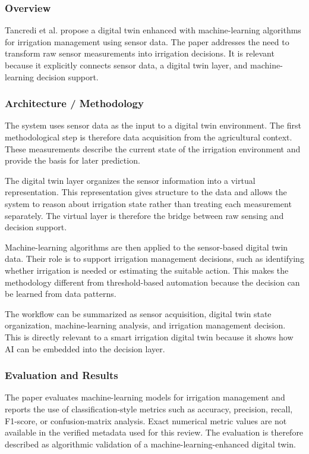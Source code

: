 \subsubsection{Overview}

Tancredi et al. propose a digital twin enhanced with machine-learning algorithms for irrigation management using sensor data. The paper addresses the need to transform raw sensor measurements into irrigation decisions. It is relevant because it explicitly connects sensor data, a digital twin layer, and machine-learning decision support.

\subsubsection{Architecture / Methodology}

The system uses sensor data as the input to a digital twin environment. The first methodological step is therefore data acquisition from the agricultural context. These measurements describe the current state of the irrigation environment and provide the basis for later prediction.

The digital twin layer organizes the sensor information into a virtual representation. This representation gives structure to the data and allows the system to reason about irrigation state rather than treating each measurement separately. The virtual layer is therefore the bridge between raw sensing and decision support.

Machine-learning algorithms are then applied to the sensor-based digital twin data. Their role is to support irrigation management decisions, such as identifying whether irrigation is needed or estimating the suitable action. This makes the methodology different from threshold-based automation because the decision can be learned from data patterns.

The workflow can be summarized as sensor acquisition, digital twin state organization, machine-learning analysis, and irrigation management decision. This is directly relevant to a smart irrigation digital twin because it shows how AI can be embedded into the decision layer.

\subsubsection{Evaluation and Results}

The paper evaluates machine-learning models for irrigation management and reports the use of classification-style metrics such as accuracy, precision, recall, F1-score, or confusion-matrix analysis. Exact numerical metric values are not available in the verified metadata used for this review. The evaluation is therefore described as algorithmic validation of a machine-learning-enhanced digital twin.

